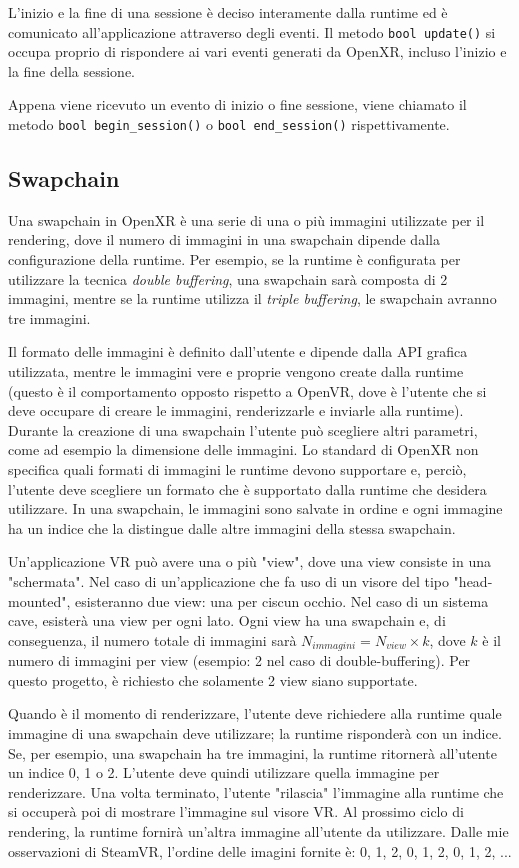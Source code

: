 \documentclass[twoside]{supsistudent}
\begin{document}
L'inizio e la fine di una sessione è deciso interamente dalla runtime ed è comunicato all'applicazione attraverso degli eventi. Il metodo \texttt{bool update()} si occupa proprio di rispondere ai vari eventi generati da OpenXR, incluso l'inizio e la fine della sessione.

Appena viene ricevuto un evento di inizio o fine sessione, viene chiamato il metodo \texttt{bool begin\_session()} o \texttt{bool end\_session()} rispettivamente.

\subsection{Swapchain}

Una swapchain in OpenXR è una serie di una o più immagini utilizzate per il rendering, dove il numero di immagini in una swapchain dipende dalla configurazione della runtime. Per esempio, se la runtime è configurata per utilizzare la tecnica \textit{double buffering}, una swapchain sarà composta di 2 immagini, mentre se la runtime utilizza il \textit{triple buffering}, le swapchain avranno tre immagini.

Il formato delle immagini è definito dall'utente e dipende dalla API grafica utilizzata, mentre le immagini vere e proprie vengono create dalla runtime (questo è il comportamento opposto rispetto a OpenVR, dove è l'utente che si deve occupare di creare le immagini, renderizzarle e inviarle alla runtime). Durante la creazione di una swapchain l'utente può scegliere altri parametri, come ad esempio la dimensione delle immagini. Lo standard di OpenXR non specifica quali formati di immagini le runtime devono supportare e, perciò, l'utente deve scegliere un formato che è supportato dalla runtime che desidera utilizzare. In una swapchain, le immagini sono salvate in ordine e ogni immagine ha un indice che la distingue dalle altre immagini della stessa swapchain.

Un'applicazione VR può avere una o più "view", dove una view consiste in una "schermata". Nel caso di un'applicazione che fa uso di un visore del tipo "head-mounted", esisteranno due view: una per ciscun occhio. Nel caso di un sistema cave, esisterà una view per ogni lato. Ogni view ha una swapchain e, di conseguenza, il numero totale di immagini sarà $ {N}_{immagini} = {N}_{view} \times k $, dove $ k $ è il numero di immagini per view (esempio: 2 nel caso di double-buffering). Per questo progetto, è richiesto che solamente 2 view siano supportate.

Quando è il momento di renderizzare, l'utente deve richiedere alla runtime quale immagine di una swapchain deve utilizzare; la runtime risponderà con un indice. Se, per esempio, una swapchain ha tre immagini, la runtime ritornerà all'utente un indice 0, 1 o 2. L'utente deve quindi utilizzare quella immagine per renderizzare. Una volta terminato, l'utente "rilascia" l'immagine alla runtime che si occuperà poi di mostrare l'immagine sul visore VR. Al prossimo ciclo di rendering, la runtime fornirà un'altra immagine all'utente da utilizzare. Dalle mie osservazioni di SteamVR, l'ordine delle imagini fornite è: 0, 1, 2, 0, 1, 2, 0, 1, 2, ...
\end{document}
